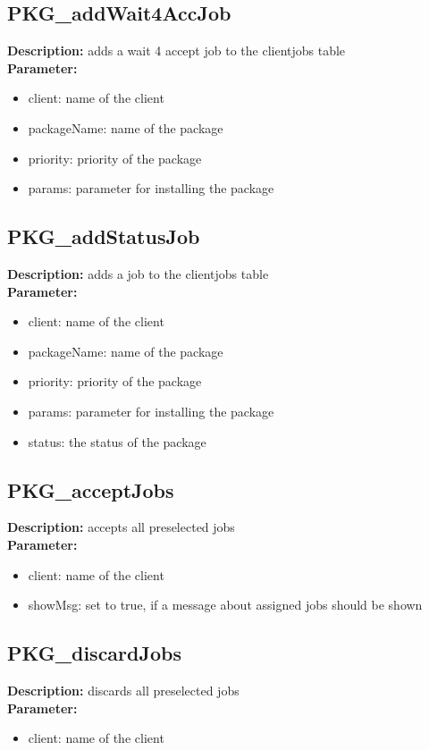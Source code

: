 \subsection{PKG\_addWait4AccJob}
\textbf{Description:} adds a wait 4 accept job to the clientjobs table\\
\textbf{Parameter:}
\begin{itemize}
\item client: name of the client
\item packageName: name of the package
\item priority: priority of the package
\item params: parameter for installing the package
\end{itemize}

\subsection{PKG\_addStatusJob}
\textbf{Description:} adds a job to the clientjobs table\\
\textbf{Parameter:}
\begin{itemize}
\item client: name of the client
\item packageName: name of the package
\item priority: priority of the package
\item params: parameter for installing the package
\item status: the status of the package
\end{itemize}

\subsection{PKG\_acceptJobs}
\textbf{Description:} accepts all preselected jobs\\
\textbf{Parameter:}
\begin{itemize}
\item client: name of the client
\item showMsg: set to true, if a message about assigned jobs should be shown
\end{itemize}

\subsection{PKG\_discardJobs}
\textbf{Description:} discards all preselected jobs\\
\textbf{Parameter:}
\begin{itemize}
\item client: name of the client
\end{itemize}

